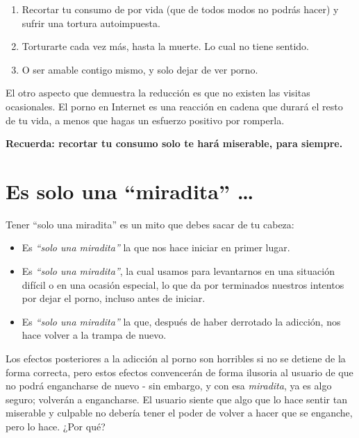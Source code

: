 \documentclass[
  openany]{book}
\providecommand{\tightlist}{%
  \setlength{\itemsep}{0pt}\setlength{\parskip}{0pt}}
\begin{document}
\begin{enumerate}
\def\labelenumi{\arabic{enumi}.}
\tightlist
\item
  Recortar tu consumo de por vida (que de todos modos no podrás hacer) y sufrir una tortura autoimpuesta.
\item
  Torturarte cada vez más, hasta la muerte. Lo cual no tiene sentido.
\item
  O ser amable contigo mismo, y solo dejar de ver porno.
\end{enumerate}

El otro aspecto que demuestra la reducción es que no existen las visitas ocasionales. El porno en Internet es una reacción en cadena que durará el resto de tu vida, a menos que hagas un esfuerzo positivo por romperla.

\textbf{Recuerda: recortar tu consumo solo te hará miserable, para siempre.}

\hypertarget{es-solo-una-miradita}{%
\chapter{Es solo una ``miradita'' \ldots{}}\label{es-solo-una-miradita}}

Tener ``solo una miradita'' es un mito que debes sacar de tu cabeza:

\begin{itemize}
\tightlist
\item
  Es \emph{``solo una miradita''} la que nos hace iniciar en primer lugar.
\item
  Es \emph{``solo una miradita''}, la cual usamos para levantarnos en una situación difícil o en una ocasión especial, lo que da por terminados nuestros intentos por dejar el porno, incluso antes de iniciar.
\item
  Es \emph{``solo una miradita''} la que, después de haber derrotado la adicción, nos hace volver a la trampa de nuevo.
\end{itemize}

Los efectos posteriores a la adicción al porno son horribles si no se detiene de la forma correcta, pero estos efectos convencerán de forma ilusoria al usuario de que no podrá engancharse de nuevo - sin embargo, y con esa \emph{miradita}, ya es algo seguro; volverán a engancharse. El usuario siente que algo que lo hace sentir tan miserable y culpable no debería tener el poder de volver a hacer que se enganche, pero lo hace. ¿Por qué?
\end{document}
